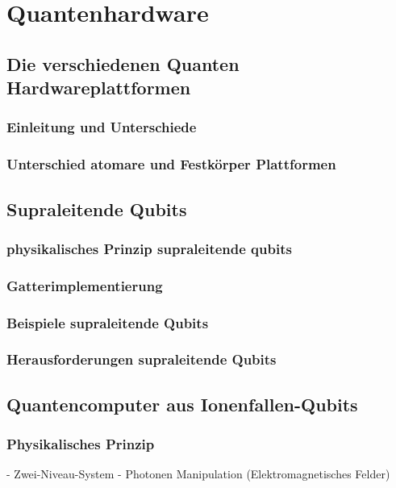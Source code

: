 \chapter{Quantenhardware}
\label{hardware} %



\section{Die verschiedenen Quanten Hardwareplattformen}
\subsection{Einleitung und Unterschiede}
\subsection{Unterschied atomare und Festkörper Plattformen}

\section{Supraleitende Qubits}
\subsection{physikalisches Prinzip supraleitende qubits}
\subsection{Gatterimplementierung}
\subsection{Beispiele supraleitende Qubits}
\subsection{Herausforderungen supraleitende Qubits}

\section{Quantencomputer aus Ionenfallen-Qubits}
\subsection{Physikalisches Prinzip}
    - Zwei-Niveau-System
    - Photonen Manipulation (Elektromagnetisches Felder)
